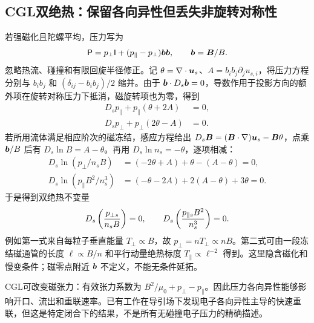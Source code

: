 \subsection{CGL双绝热：保留各向异性但丢失非旋转对称性}
若强磁化且陀螺平均，压力写为
\begin{equation}\mathsf P=p_\perp\mathsf I+(p_\parallel-p_\perp)\bm{b}\bm{b},\qquad\bm{b}=\bm{B}/B.
\end{equation}
忽略热流、碰撞和有限回旋半径修正。记 $\theta=\nabla\cdot\bm{u}_s$、$A=b_ib_j\partial_ju_{s,i}$，将压力方程分别与 $b_ib_j$ 和 $(\delta_{ij}-b_ib_j)/2$ 缩并。由于 $\bm{b}\cdot D_s\bm{b}=0$，导数作用于投影方向的额外项在旋转对称压力下抵消，磁旋转项也为零，得到
\begin{align}
D_sp_\parallel+p_\parallel(\theta+2A)&=0,\\
D_sp_\perp+p_\perp(2\theta-A)&=0.
\end{align}
若所用流体满足相应阶次的磁冻结，感应方程给出
$D_s\bm{B}=(\bm{B}\cdot\nabla)\bm{u}_s-\bm{B}\theta$，点乘 $\bm{b}/B$ 后有
$D_s\ln B=A-\theta$。再用 $D_s\ln n_s=-\theta$，逐项相减：
\begin{align}
D_s\ln(p_\perp/n_sB)&=(-2\theta+A)+\theta-(A-\theta)=0,\\
D_s\ln(p_\parallel B^2/n_s^3)&=(-\theta-2A)+2(A-\theta)+3\theta=0.
\end{align}
于是得到双绝热不变量
\begin{equation}D_s\left({p_{\perp s}\over n_sB}\right)=0,\qquad
D_s\left({p_{\parallel s}B^2\over n_s^3}\right)=0.\label{eq:cgl}
\end{equation}
例如第一式来自每粒子垂直能量 $T_\perp\propto B$，故 $p_\perp=nT_\perp\propto nB$。第二式可由一段冻结磁通管的长度 $\ell\propto B/n$ 和平行动量绝热标度 $T_\parallel\propto\ell^{-2}$ 得到。这里隐含磁化和慢变条件；磁零点附近 $\bm{b}$ 不定义，不能无条件延拓。

CGL可改变磁张力：有效张力系数为 $B^2/\mu_0+p_\perp-p_\parallel$。因此压力各向异性能够影响开口、流出和重联速率。已有工作在导引场下发现电子各向异性主导的快速重联，但这是特定闭合下的结果，不是所有无碰撞电子压力的精确描述。\citep{Cassak2015}



